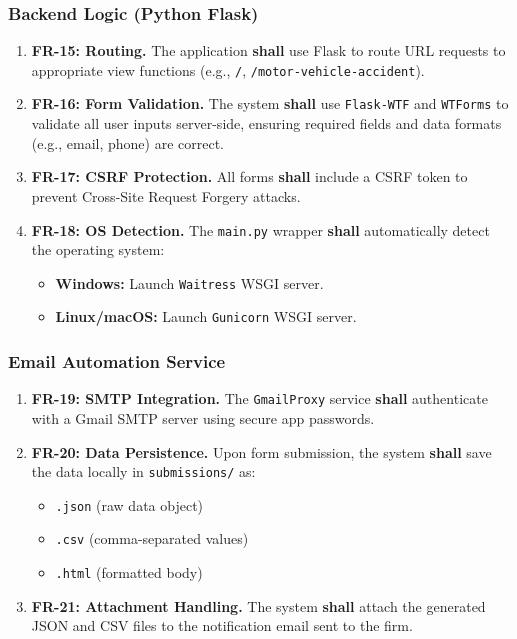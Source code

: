\documentclass{article}
\begin{document}
\subsubsection{Backend Logic (Python Flask)}
\begin{enumerate}
  \item \textbf{FR-15: Routing.} The application \textbf{shall} use Flask to route URL requests to appropriate view functions (e.g., \texttt{/}, \texttt{/motor-vehicle-accident}).
  \item \textbf{FR-16: Form Validation.} The system \textbf{shall} use \texttt{Flask-WTF} and \texttt{WTForms} to validate all user inputs server-side, ensuring required fields and data formats (e.g., email, phone) are correct.
  \item \textbf{FR-17: CSRF Protection.} All forms \textbf{shall} include a CSRF token to prevent Cross-Site Request Forgery attacks.
  \item \textbf{FR-18: OS Detection.} The \texttt{main.py} wrapper \textbf{shall} automatically detect the operating system:
  \begin{itemize}
    \item \textbf{Windows:} Launch \texttt{Waitress} WSGI server.
    \item \textbf{Linux/macOS:} Launch \texttt{Gunicorn} WSGI server.
  \end{itemize}
\end{enumerate}

\subsubsection{Email Automation Service}
\begin{enumerate}
  \item \textbf{FR-19: SMTP Integration.} The \texttt{GmailProxy} service \textbf{shall} authenticate with a Gmail SMTP server using secure app passwords.
  \item \textbf{FR-20: Data Persistence.} Upon form submission, the system \textbf{shall} save the data locally in \texttt{submissions/} as:
  \begin{itemize}
    \item \texttt{.json} (raw data object)
    \item \texttt{.csv} (comma-separated values)
    \item \texttt{.html} (formatted body)
  \end{itemize}
  \item \textbf{FR-21: Attachment Handling.} The system \textbf{shall} attach the generated JSON and CSV files to the notification email sent to the firm.
\end{enumerate}
\end{document}
